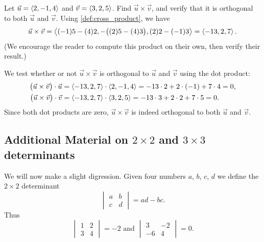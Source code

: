 \begin{example}\label{ex_crossp1}%
Let $\vec u = \left\langle 2,-1,4\right\rangle$ and $\vec v = \left\langle 3,2,5\right\rangle$. Find $\vec u\times\vec v$, and verify that it is orthogonal to both $\vec u$ and $\vec v$.
\solution
Using \autoref{def:cross_product}, we have
\[
\vec u\times\vec v = \left\langle (-1)5-(4)2,-\bigl((2)5-(4)3\bigr), (2)2-(-1)3\right\rangle=\left\langle -13,2,7\right\rangle.
\] 
(We encourage the reader to compute this product on their own, then verify their result.)

We test whether or not $\vec u\times\vec v$ is orthogonal to $\vec u$ and $\vec v$ using the dot product:
\begin{align*}
\bigl(\vec u\times\vec v\bigr) \cdot \vec u
 &=\left\langle -13,2,7\right\rangle\cdot\left\langle 2,-1,4\right\rangle=-13\cdot2+2\cdot(-1)+7\cdot4=0, \\
\bigl(\vec u\times\vec v\bigr) \cdot \vec v
 &=\left\langle -13,2,7\right\rangle\cdot\left\langle 3,2,5\right\rangle=-13\cdot3+2\cdot2+7\cdot5=0.
\end{align*}
Since both dot products are zero, $\vec u\times\vec v$ is indeed orthogonal to both $\vec u$ and $\vec v$.
\end{example}

\subsection{Additional Material on \texorpdfstring{$2\times2$ and $3\times3$}{2x2 and 3x3} determinants}

We will now make a slight digression.  Given four numbers $a$, $b$, $c$, $d$ we define the $2 \times 2$ determinant
\[\begin{vmatrix}a & b \\ c & d\end{vmatrix} = ad - bc.\]
Thus
\[
\begin{vmatrix}1 & 2 \\3 & 4\end{vmatrix} = -2
\text{ and }
\begin{vmatrix}3 & -2 \\ -6 & 4\end{vmatrix} = 0.
\]

